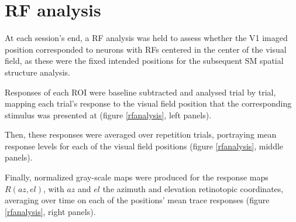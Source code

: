 \section{RF analysis}

At each session's end, a RF analysis was held to assess whether the V1 imaged position corresponded to neurons with RFs centered in the center of the visual field, as these were the fixed intended positions for the subsequent SM spatial structure analysis.

Responses of each ROI were baseline subtracted and analysed trial by trial, mapping each trial's response to the visual field position that the corresponding stimulus was presented at (figure \ref{rfanalysis}, left panels).

Then, these responses were averaged over repetition trials, portraying mean response levels for each of the visual field positions (figure \ref{rfanalysis}, middle panels).

Finally, normalized gray-scale maps were produced for the response maps $R(az, el)$, with $az$ and $el$ the azimuth and elevation retinotopic coordinates, averaging over time on each of the positions' mean trace responses (figure \ref{rfanalysis}, right panels).

